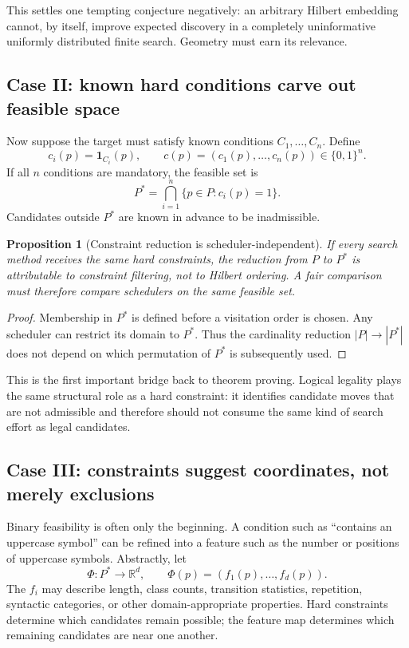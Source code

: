 \documentclass[11pt]{article}
\theoremstyle{hilberttheorem}
\newtheorem{proposition}{Proposition}
\begin{document}
This settles one tempting conjecture negatively: an arbitrary Hilbert embedding cannot, by itself, improve expected discovery in a completely uninformative uniformly distributed finite search. Geometry must earn its relevance.

\subsection{Case II: known hard conditions carve out feasible space}\label{subsec:hard-conditions}
Now suppose the target must satisfy known conditions $C_1,\ldots,C_n$. Define
\[
c_i(p)=\mathbf 1_{C_i}(p),\qquad c(p)=(c_1(p),\ldots,c_n(p))\in\{0,1\}^n.
\]
If all $n$ conditions are mandatory, the feasible set is
\[
P^*=\bigcap_{i=1}^{n}\{p\in P:c_i(p)=1\}.
\]
Candidates outside $P^*$ are known in advance to be inadmissible.

\begin{proposition}[Constraint reduction is scheduler-independent]
If every search method receives the same hard constraints, the reduction from $P$ to $P^*$ is attributable to constraint filtering, not to Hilbert ordering. A fair comparison must therefore compare schedulers on the same feasible set.
\end{proposition}
\begin{proof}
Membership in $P^*$ is defined before a visitation order is chosen. Any scheduler can restrict its domain to $P^*$. Thus the cardinality reduction $|P|\to|P^*|$ does not depend on which permutation of $P^*$ is subsequently used.
\end{proof}
This is the first important bridge back to theorem proving. Logical legality plays the same structural role as a hard constraint: it identifies candidate moves that are not admissible and therefore should not consume the same kind of search effort as legal candidates.

\subsection{Case III: constraints suggest coordinates, not merely exclusions}\label{subsec:features}
Binary feasibility is often only the beginning. A condition such as ``contains an uppercase symbol'' can be refined into a feature such as the number or positions of uppercase symbols. Abstractly, let
\[
\Phi:P^*\to\mathbb R^d,\qquad \Phi(p)=(f_1(p),\ldots,f_d(p)).
\]
The $f_i$ may describe length, class counts, transition statistics, repetition, syntactic categories, or other domain-appropriate properties. Hard constraints determine which candidates remain possible; the feature map determines which remaining candidates are near one another.
\end{document}
